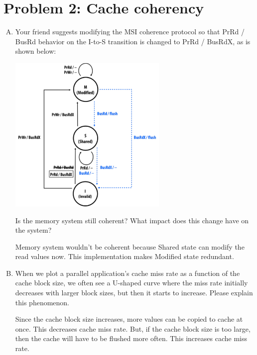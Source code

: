 \documentclass[11pt]{article}
\newenvironment{choice}{\begin{enumerate}[A.]}{\end{enumerate}}
\newenvironment{answer}{\begin{minipage}[c][1.5in]{\textwidth}}{\end{minipage}}
\begin{document}
\section*{Problem 2: Cache coherency}
\begin{choice}
  \item Your friend suggests modifying the MSI coherence protocol so that PrRd / BusRd behavior on the
  I-to-S transition is changed to PrRd / BusRdX, as is shown below:

\begin{center}
\includegraphics[width=3in]{msi.pdf} %
\end{center}





  Is the memory system still coherent? What impact does this change have on the system?

\begin{answer}
Memory system wouldn't be coherent because Shared state can modify the read values now. \newline
This implementation makes Modified state redundant.

\end{answer}

\item When we plot a parallel application’s cache miss rate as a function of the cache block size, we often see a U-shaped curve where the miss rate initially decreases with larger block sizes, but then it starts to increase. Please explain this phenomenon.

\begin{answer}
Since the cache block size increases, more values can be copied to cache at once. This decreases cache miss rate. \newline
But, if the cache block size is too large, then the cache will have to be flushed more often. This increases cache miss rate.\newline


\end{answer}


\end{choice}  
\end{document}
